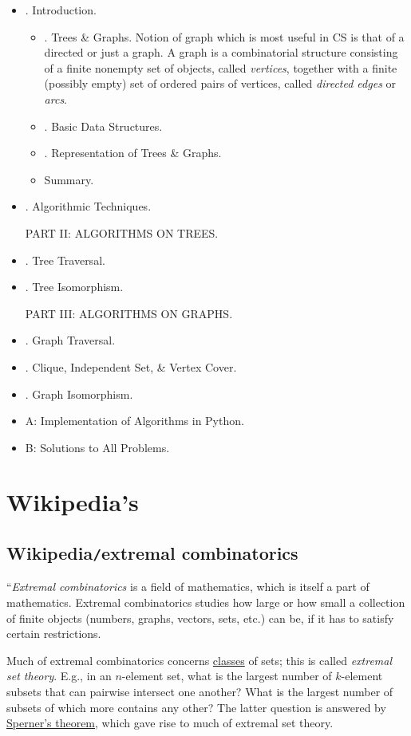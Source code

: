\documentclass{article}
\begin{document}
\begin{itemize}
	\item {. Introduction.}
	\begin{itemize}
		\item {. Trees \& Graphs.} Notion of graph which is most useful in CS is that of a directed or just a graph. A graph is a combinatorial structure consisting of a finite nonempty set of objects, called {\it vertices}, together with a finite (possibly empty) set of ordered pairs of vertices, called {\it directed edges} or {\it arcs}.
		\item {. Basic Data Structures.}
		\item {. Representation of Trees \& Graphs.}
		\item {\sf Summary.}
	\end{itemize}
	\item {. Algorithmic Techniques.}
	
	{\sf PART II: ALGORITHMS ON TREES.}
	\item {. Tree Traversal.}
	\item {. Tree Isomorphism.}
	
	{\sf PART III: ALGORITHMS ON GRAPHS.}
	\item {. Graph Traversal.}
	\item {. Clique, Independent Set, \& Vertex Cover.}
	\item {. Graph Isomorphism.}
	\item {\sf A: Implementation of Algorithms in Python.}
	\item {\sf B: Solutions to All Problems.}
\end{itemize}



\section{Wikipedia's}

\subsection{Wikipedia{\tt/}extremal combinatorics}
``{\it Extremal combinatorics} is a field of mathematics, which is itself a part of mathematics. Extremal combinatorics studies how large or how small a collection of finite objects (numbers, graphs, vectors, sets, etc.) can be, if it has to satisfy certain restrictions.

Much of extremal combinatorics concerns \href{https://en.wikipedia.org/wiki/Class_(set_theory)}{classes} of sets; this is called {\it extremal set theory}. E.g., in an $n$-element set, what is the largest number of $k$-element subsets that can pairwise intersect one another? What is the largest number of subsets of which more contains any other? The latter question is answered by \href{https://en.wikipedia.org/wiki/Sperner%27s_theorem}{Sperner's theorem}, which gave rise to much of extremal set theory.
\end{document}
